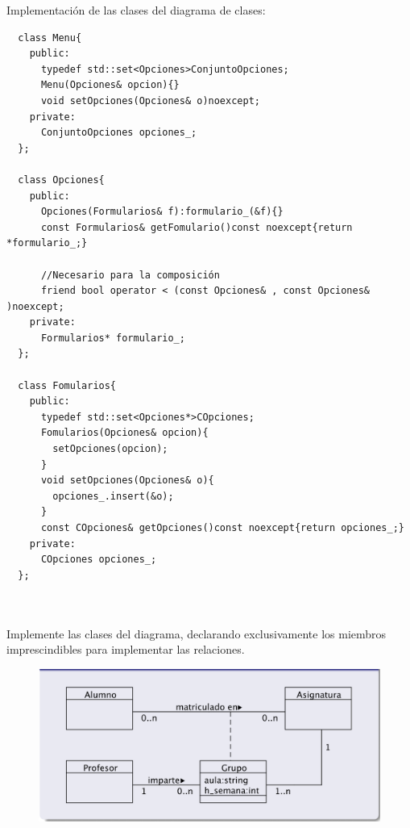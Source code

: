 Implementación de las clases del diagrama de clases:
\begin{verbatim}
  class Menu{
    public: 
      typedef std::set<Opciones>ConjuntoOpciones;
      Menu(Opciones& opcion){}
      void setOpciones(Opciones& o)noexcept;
    private:
      ConjuntoOpciones opciones_;
  };

  class Opciones{
    public:
      Opciones(Formularios& f):formulario_(&f){}
      const Formularios& getFomulario()const noexcept{return *formulario_;}

      //Necesario para la composición
      friend bool operator < (const Opciones& , const Opciones& )noexcept;
    private:
      Formularios* formulario_;
  };

  class Fomularios{
    public:
      typedef std::set<Opciones*>COpciones;
      Fomularios(Opciones& opcion){
        setOpciones(opcion);
      }
      void setOpciones(Opciones& o){
        opciones_.insert(&o);
      }
      const COpciones& getOpciones()const noexcept{return opciones_;}
    private:
      COpciones opciones_;
  };

  
\end{verbatim}
 Implemente las clases del diagrama, declarando exclusivamente los miembros imprescindibles para implementar las relaciones.

\begin{figure}[h]
  \begin{center}
    \includegraphics[width=\textwidth]{assets/Seminario3_1_2.png}
  \end{center}
\end{figure}

